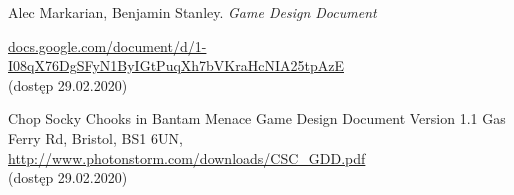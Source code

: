 \documentclass[a4paper,12pt, twoside, titlepage]{article}
\begin{document}
\begingroup
\renewcommand{\section}[2]{}%
\begin{thebibliography}{}
	Alec Markarian, Benjamin Stanley.
	\emph{Game Design Document}

	\href{https://docs.google.com/document/d/1-I08qX76DgSFyN1ByIGtPuqXh7bVKraHcNIA25tpAzE}{docs.google.com/document/d/1-I08qX76DgSFyN1ByIGtPuqXh7bVKraHcNIA25tpAzE}\\
	(dostęp 29.02.2020)

	Chop Socky Chooks in Bantam Menace Game Design Document Version 1.1 Gas Ferry Rd, Bristol, BS1 6UN, \url{http://www.photonstorm.com/downloads/CSC_GDD.pdf}\\
	(dostęp 29.02.2020)

\end{thebibliography}
\endgroup
\end{document}
